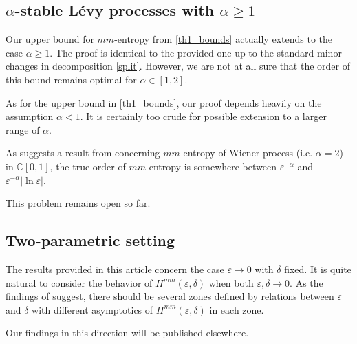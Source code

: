 \documentclass[12pt]{article}
\newcommand\C{\mathbb C}
\let\de\delta
\let\ep\varepsilon
\let\ge\geqslant
\theoremstyle{definition}
\begin{document}
\subsection{$\alpha$-stable L\'evy processes with $\alpha\ge 1$}

Our upper bound for $mm$-entropy from \eqref{th1_bounds} actually extends to the case $\alpha\ge 1$. The proof is identical to the provided one up to the standard minor changes in decomposition \eqref{split}. However, we are not at all sure that the order of this bound remains optimal for $\alpha\in [1,2]$.

As for the upper bound in \eqref{th1_bounds}, our proof depends heavily on the assumption $\alpha<1$. It is certainly too crude for possible extension to a larger range of $\alpha$.

As suggests a result  from \cite{VerLif} concerning $mm$-entropy of Wiener process (i.e. $\alpha=2$) in $\C[0,1]$,
the true order of $mm$-entropy is somewhere between $\ep^{-\alpha}$ and 
$\ep^{-\alpha}|\ln\ep|$.

This problem remains open so far.

\subsection{Two-parametric setting}
The results provided in this article concern the case $\ep\to 0$ with $\delta$ fixed.
It is quite  natural to consider the behavior of $H^{mm}(\ep, \de)$ when both $\ep,\delta \to 0$. As the findings of
\cite{VerLif} suggest, there should be several zones defined by relations between $\ep$ and $\delta$
with different asymptotics of $H^{mm}(\ep, \de)$ in each zone. 

Our findings in this direction will be published elsewhere.

\end{document}
